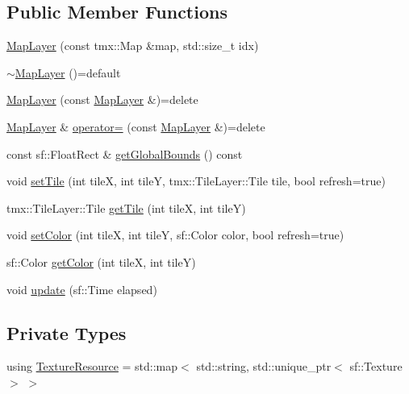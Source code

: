 \subsection*{Public Member Functions}
\begin{DoxyCompactItemize}
\item 
\hyperlink{classMapLayer_ac1b9f1e3ba6d800abf508fa11490187b}{Map\+Layer} (const tmx\+::\+Map \&map, std\+::size\+\_\+t idx)
\item 
\hyperlink{classMapLayer_a79858f9ee05242aa47ac680940e5ea74}{$\sim$\+Map\+Layer} ()=default
\item 
\hyperlink{classMapLayer_af323ddae8da169a64be1e0c216034397}{Map\+Layer} (const \hyperlink{classMapLayer}{Map\+Layer} \&)=delete
\item 
\hyperlink{classMapLayer}{Map\+Layer} \& \hyperlink{classMapLayer_a1863f3842c104aa6d460f4d9b99ec792}{operator=} (const \hyperlink{classMapLayer}{Map\+Layer} \&)=delete
\item 
const sf\+::\+Float\+Rect \& \hyperlink{classMapLayer_ae87bc38c7c030e9b2822b53f6de13d13}{get\+Global\+Bounds} () const
\item 
void \hyperlink{classMapLayer_a1152792435a0fa6203f6c3a038b93778}{set\+Tile} (int tileX, int tileY, tmx\+::\+Tile\+Layer\+::\+Tile tile, bool refresh=true)
\item 
tmx\+::\+Tile\+Layer\+::\+Tile \hyperlink{classMapLayer_a347375abb72832ea3362ba0d29898f30}{get\+Tile} (int tileX, int tileY)
\item 
void \hyperlink{classMapLayer_a4dad5e08a823925292846664ce42657d}{set\+Color} (int tileX, int tileY, sf\+::\+Color color, bool refresh=true)
\item 
sf\+::\+Color \hyperlink{classMapLayer_a6ecfbaf968ac9e6e4f814a30aa0c0f30}{get\+Color} (int tileX, int tileY)
\item 
void \hyperlink{classMapLayer_a0f7690e23ecfde7a7dc6629f9df65635}{update} (sf\+::\+Time elapsed)
\end{DoxyCompactItemize}
\subsection*{Private Types}
\begin{DoxyCompactItemize}
\item 
using \hyperlink{classMapLayer_a64011087426e436e3cb8374570378d68}{Texture\+Resource} = std\+::map$<$ std\+::string, std\+::unique\+\_\+ptr$<$ sf\+::\+Texture $>$ $>$
\end{DoxyCompactItemize}

